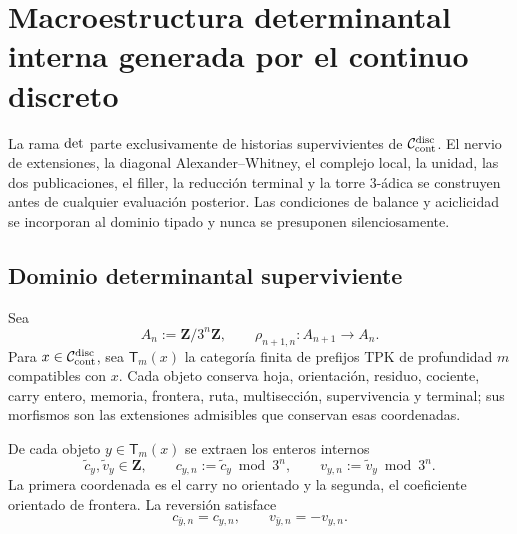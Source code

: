 \iffalse
\chapter[Macroestructura determinantal interna]{Macroestructura determinantal interna generada por el continuo discreto}
\label{chap:detint-macroestructura}

\begin{thesisbox}
La rama \({\rm det}\) parte exclusivamente de historias supervivientes de
\(\mathcal C_{\rm cont}^{\rm disc}\). El nervio de extensiones, la diagonal
Alexander--Whitney, el complejo local, la unidad, las dos publicaciones, el
filler, la reducción terminal y la torre \(3\)-ádica se construyen antes de
cualquier evaluación posterior. Las condiciones de balance y aciclicidad se
incorporan al dominio tipado y nunca se presuponen silenciosamente.
\end{thesisbox}

\section{Dominio determinantal superviviente}

Sea
\begin{equation}\label{eq:detint-an}
 A_n:=\mathbf Z/3^n\mathbf Z,
 \qquad
 \rho_{n+1,n}:A_{n+1}\longrightarrow A_n.
\end{equation}
Para \(x\in\mathcal C_{\rm cont}^{\rm disc}\), sea
\(\mathsf T_m(x)\) la categoría finita de prefijos TPK de profundidad \(m\)
compatibles con \(x\). Cada objeto conserva hoja, orientación, residuo,
cociente, carry entero, memoria, frontera, ruta, multisección, supervivencia
y terminal; sus morfismos son las extensiones admisibles que conservan esas
coordenadas.

De cada objeto \(y\in\mathsf T_m(x)\) se extraen los enteros internos
\begin{equation}\label{eq:detint-c-v-lifts}
 \widetilde c_y,\widetilde v_y\in\mathbf Z,
 \qquad
 c_{y,n}:=\widetilde c_y\bmod3^n,
 \qquad
 v_{y,n}:=\widetilde v_y\bmod3^n.
\end{equation}
La primera coordenada es el carry no orientado y la segunda, el coeficiente
orientado de frontera. La reversión satisface
\begin{equation}\label{eq:detint-or-cv}
 c_{\bar y,n}=c_{y,n},
 \qquad
 v_{\bar y,n}=-v_{y,n}.
\end{equation}

